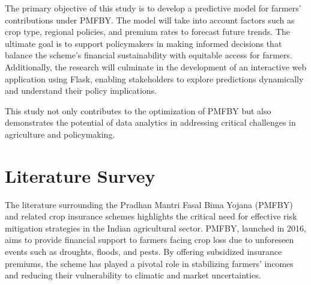 \documentclass[12pt]{article}
\begin{document}
\vspace{5pt}
The primary objective of this study is to develop a predictive model for farmers' contributions under PMFBY. The model will take into account factors such as 
crop type, regional policies, and premium rates to forecast future trends. The ultimate goal is to support policymakers in making informed decisions that 
balance the scheme’s financial sustainability with equitable access for farmers. Additionally, the research will culminate in the development of an interactive 
web application using Flask, enabling stakeholders to explore predictions dynamically and understand their policy implications.

\vspace{5pt}
This study not only contributes to the optimization of PMFBY but also demonstrates the potential of data analytics in addressing critical challenges in agriculture and policymaking.

\section{Literature Survey}
The literature surrounding the Pradhan Mantri Fasal Bima Yojana (PMFBY) and related crop insurance schemes highlights the critical need for effective risk mitigation 
strategies in the Indian agricultural sector. PMFBY, launched in 2016, aims to provide financial support to farmers facing crop loss due to unforeseen events such as 
droughts, floods, and pests. By offering subsidized insurance premiums, the scheme has played a pivotal role in stabilizing farmers' incomes and reducing their 
vulnerability to climatic and market uncertainties.
\end{document}
